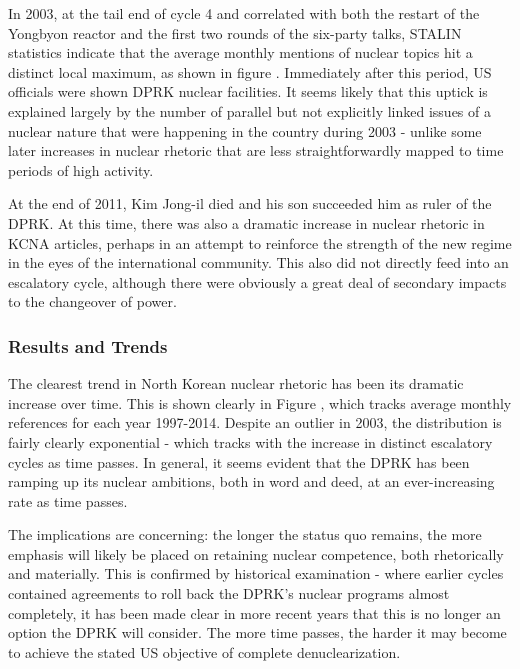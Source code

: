 \documentclass{article}
\begin{document}
In 2003, at the tail end of cycle 4 and correlated with both the restart of the Yongbyon reactor and the first two rounds of the six-party talks, STALIN statistics indicate that the average monthly mentions of nuclear topics hit a distinct local maximum, as shown in figure . Immediately after this period, US officials were shown DPRK nuclear facilities. It seems likely that this uptick is explained largely by the number of parallel but not explicitly linked issues of a nuclear nature that were happening in the country during 2003 - unlike some later increases in nuclear rhetoric that are less straightforwardly mapped to time periods of high activity.

At the end of 2011, Kim Jong-il died and his son succeeded him as ruler of the DPRK. At this time, there was also a dramatic increase in nuclear rhetoric in KCNA articles, perhaps in an attempt to reinforce the strength of the new regime in the eyes of the international community\cite{rich14}. This also did not directly feed into an escalatory cycle, although there were obviously a great deal of secondary impacts to the changeover of power.

\subsubsection{Results and Trends}

The clearest trend in North Korean nuclear rhetoric has been its dramatic increase over time. This is shown clearly in Figure , which tracks average monthly references for each year 1997-2014. Despite an outlier in 2003, the distribution is fairly clearly exponential - which tracks with the increase in distinct escalatory cycles as time passes. In general, it seems evident that the DPRK has been ramping up its nuclear ambitions, both in word and deed, at an ever-increasing rate as time passes.

The implications are concerning: the longer the status quo remains, the more emphasis will likely be placed on retaining nuclear competence, both rhetorically and materially. This is confirmed by historical examination - where earlier cycles contained agreements to roll back the DPRK's nuclear programs almost completely, it has been made clear in more recent years that this is no longer an option the DPRK will consider. The more time passes, the harder it may become to achieve the stated US objective of complete denuclearization.
\end{document}

